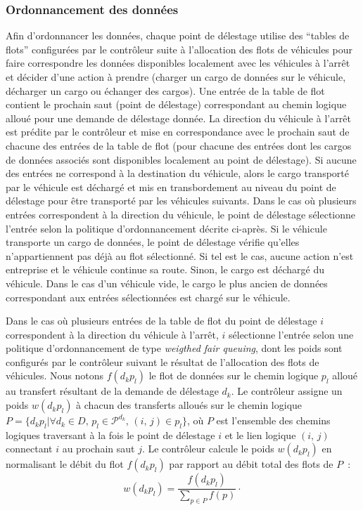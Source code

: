 \subsubsection{Ordonnancement des données} 
Afin d’ordonnancer les données, chaque point de délestage utilise des ``tables de flots'' configurées par le contrôleur suite à l’allocation des flots de véhicules pour faire correspondre les données disponibles localement avec les véhicules à l’arrêt et décider d’une action à prendre (\ie charger un cargo de données sur le véhicule, décharger un cargo ou échanger des cargos). Une entrée de la table de flot contient le prochain saut (\ie point de délestage) correspondant au chemin logique alloué pour une demande de délestage donnée. La direction du véhicule à l’arrêt est prédite par le contrôleur et mise en correspondance avec le prochain saut de chacune des entrées de la table de flot (pour chacune des entrées dont les cargos de données associés sont disponibles localement au point de délestage). Si aucune des entrées ne correspond à la destination du véhicule, alors le cargo transporté par le véhicule est déchargé et mis en transbordement au niveau du point de délestage pour être transporté par les véhicules suivants. Dans le cas où plusieurs entrées correspondent à la direction du véhicule, le point de délestage sélectionne l’entrée selon la politique d’ordonnancement décrite ci-après. Si le véhicule transporte un cargo de données, le point de délestage vérifie qu’elles n’appartiennent pas déjà au flot sélectionné. Si tel est le cas, aucune action n’est entreprise et le véhicule continue sa route. Sinon, le cargo est déchargé du véhicule. Dans le cas d’un véhicule vide, le cargo le plus ancien de données correspondant aux entrées sélectionnées est chargé sur le véhicule.  
 
 
Dans le cas où plusieurs entrées de la table de flot du point de délestage $i$ correspondent à la direction du véhicule à l’arrêt, $i$ sélectionne l’entrée selon une politique d’ordonnancement de type \textit{weigthed fair queuing}, dont les poids sont configurés par le contrôleur suivant le résultat de l’allocation des flots de véhicules. Nous notons $f(d_kp_l)$ le flot de données sur le chemin logique $p_l$ alloué au transfert résultant de la demande de délestage $d_k$. Le contrôleur assigne un poids $w(d_kp_l)$ à chacun des transferts alloués sur le chemin logique $P = \{d_kp_l | \forall d_k\in D,\, p_l\in \mathcal{P}^{d_k},\, (i,\,j) \in p_l\}$, où $P$ est l’ensemble des chemins logiques traversant à la fois le point de délestage $i$ et le lien logique $(i,\,j)$ connectant $i$ au prochain saut $j$. Le contrôleur calcule le poids $w(d_kp_l)$ en normalisant le débit du flot $f(d_kp_l)$ par rapport au débit total des flots de $P$~: 
\begin{equation} 
    w(d_kp_l) = \frac{f(d_kp_l)}{\sum_{p\in P} f(p)}\cdot 
\end{equation} 
 
